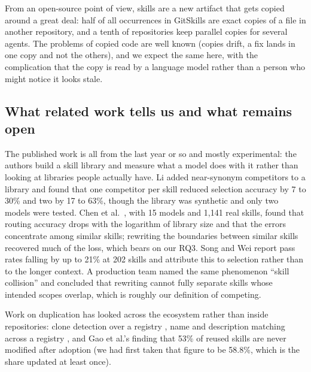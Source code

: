 \documentclass[11pt]{article}
\begin{document}
From an open-source point of view, skills are a new artifact that gets copied around a great deal: half of all occurrences
in GitSkills are exact copies of a file in another repository, and a tenth of repositories keep parallel copies for several
agents. The problems of copied code are well known (copies drift, a fix lands in one copy and not the others), and we expect
the same here, with the complication that the copy is read by a language model rather than a person who might notice it
looks stale.

\subsection{What related work tells us and what remains open}
The published work is all from the last year or so and mostly experimental: the authors build a skill library and measure
what a model does with it rather than looking at libraries people actually have. Li
\cite{li2026singleagent} added near-synonym competitors to a library and found that one competitor per skill reduced
selection accuracy by 7 to 30\% and two by 17 to 63\%, though the library was synthetic and only two models were tested. Chen
et al.\ \cite{chen2026scaling}, with 15 models and 1{,}141 real skills, found that routing accuracy drops with the logarithm
of library size and that the errors concentrate among similar skills; rewriting the boundaries between similar skills
recovered much of the loss, which bears on our RQ3. Song and Wei \cite{song2026shadowing} report pass rates falling by up to
21\% at 202 skills and attribute this to selection rather than to the longer context. A production team named the same
phenomenon ``skill collision'' \cite{zhou2026collision} and concluded that rewriting cannot fully separate skills whose
intended scopes overlap, which is roughly our definition of competing.

Work on duplication has looked across the ecosystem rather than inside repositories: clone detection over a registry
\cite{zhu2026clones}, name and description matching across a registry \cite{jia2026islands}, and Gao et al.'s finding
\cite{gao2026reuse} that 53\% of reused skills are never modified after adoption (we had first taken that figure to be
58.8\%, which is the share updated at least once).
\end{document}
